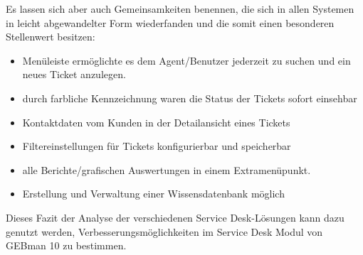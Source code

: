 \noindent
Es lassen sich aber auch Gemeinsamkeiten benennen, die sich in allen Systemen in leicht abgewandelter Form wiederfanden und die somit einen besonderen Stellenwert besitzen:

\begin{itemize}
\item Menüleiste ermöglichte es dem Agent/Benutzer jederzeit zu suchen und ein neues Ticket anzulegen.
		 
\item durch farbliche Kennzeichnung waren die Status der Tickets sofort einsehbar
		
\item  Kontaktdaten vom Kunden in der Detailansicht eines Tickets

\item Filtereinstellungen für Tickets konfigurierbar und speicherbar

\item alle Berichte/grafischen Auswertungen in einem Extramenüpunkt.

\item Erstellung und Verwaltung einer Wissensdatenbank möglich
\end{itemize}

\noindent
Dieses Fazit der Analyse der verschiedenen Service Desk-Lösungen kann dazu genutzt werden, Verbesserungsmöglichkeiten im Service Desk Modul von GEBman 10 zu  bestimmen. 
